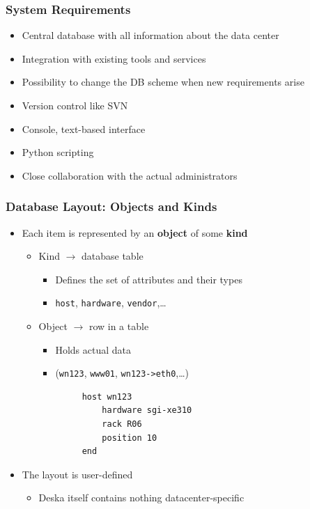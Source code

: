 \documentclass{beamer}
\begin{document}
\begin{frame}[fragile]
\frametitle{System Requirements}
\begin{itemize}
    \item Central database with all information about the data center
    \item Integration with existing tools and services
    \item Possibility to change the DB scheme when new requirements arise
    \item Version control like SVN
    \item Console, text-based interface
    \item Python scripting
    \item Close collaboration with the actual administrators
\end{itemize}
\end{frame}

\begin{frame}[fragile]
\frametitle{Database Layout: Objects and Kinds}
\begin{itemize}
    \item Each item is represented by an {\bf object} of some {\bf kind}
        \begin{itemize}
            \item Kind $\rightarrow$ database table
                \begin{itemize}
                    \item Defines the set of attributes and their types
                    \item {\tt host}, {\tt hardware}, {\tt vendor},\ldots
                \end{itemize}
            \item Object $\rightarrow$ row in a table
                \begin{itemize}
                    \item Holds actual data
                    \item ({\tt wn123}, {\tt www01}, {\tt wn123->eth0},\ldots)
                \end{itemize}
        \end{itemize}
        \begin{verbatim}
            host wn123
                hardware sgi-xe310
                rack R06
                position 10
            end
        \end{verbatim}
    \item The layout is user-defined
        \begin{itemize}
            \item Deska itself contains nothing datacenter-specific
        \end{itemize}
\end{itemize}
\end{frame}
\end{document}
